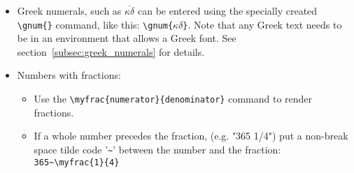 \documentclass{report}
\begin{document}
\begin{itemize}
\item Greek numerals, such as $\overline{\kappa\delta}$ can be entered using
the specially created \verb+\gnum{}+ command,
like this: \verb+\gnum{+$\kappa\delta$\verb+}+.
Note that any Greek text needs to be in an environment that 
allows a Greek font.
See section~\ref{subsec:greek_numerals} for details.

\item Numbers with fractions:
\begin{itemize}
\item Use the \verb+\myfrac{numerator}{denominator}+ command to render fractions.
\item If a whole number precedes the fraction,
(e.g. "365 1/4")
put a non-break space tilde code '\verb+~+' between the number
and the fraction: \verb+365~\myfrac{1}{4}+ 
\end{itemize}

\end{itemize}

\end{document}
